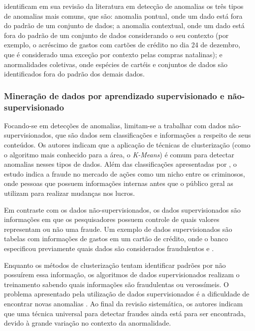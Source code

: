 \documentclass[smallextended]{svjour3}
\begin{document}
\cite{Ahmed2015} identificam em sua revisão da literatura em detecção de anomalias os três tipos de anomalias mais comuns, que são: anomalia pontual, onde um dado está fora do padrão de um conjunto de dados; a anomalia contextual, onde um dado está fora do padrão de um conjunto de dados considerando o seu contexto (por exemplo, o acréscimo de gastos com cartões de crédito no dia 24 de dezembro, que é considerado uma exceção por contexto pelas compras natalinas); e anormalidades coletivas, onde espécies de cartéis e conjuntos de dados são identificados fora do padrão dos demais dados.

\subsubsection{Mineração de dados por aprendizado supervisionado e não-supervisionado}

Focando-se em detecções de anomalias, \cite{Ahmed2015} limitam-se a trabalhar com dados não-supervisionados, que são dados sem classificações e informações a respeito de seus conteúdos. Os autores indicam que a aplicação de técnicas de clusterização (como o algoritmo mais conhecido para a área, o \emph{K-Means}) é comum para detectar anomalias nesses tipos de dados. Além das classificações apresentadas por \cite{Abdallah2016}, o estudo indica a fraude no mercado de ações como um nicho entre os criminosos, onde pessoas que possuem informações internas antes que o público geral as utilizam para realizar mudanças nos lucros. 

Em contraste com os dados não-supervisionados, os dados supervisionados são informações em que os pesquisadores possuem controle de quais valores representam ou não uma fraude. Um exemplo de dados supervisionados são tabelas com informações de gastos em um cartão de crédito, onde o banco especificou previamente quais dados são considerados fraudulentos \citep{Akoglu2015} e \citep{Branco2016}. 

Enquanto os métodos de clusterização tentam identificar padrões por não possuírem essa informação, os algoritmos de dados supervisionados realizam o treinamento sabendo quais informações são fraudulentas ou verossímeis. O problema apresentado pela utilização de dados supervisionados é a dificuldade de encontrar novas anomalias \citep{Ahmed2015}. Ao final da revisão sistemática, os autores indicam que uma técnica universal para detectar fraudes ainda está para ser encontrada, devido à grande variação no contexto da anormalidade.
\end{document}
